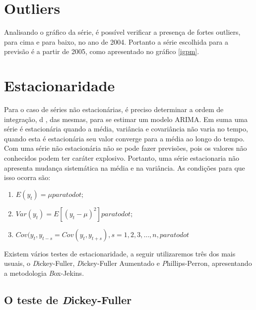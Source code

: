 \documentclass[a4paper,12pt,oneside,titlepage]{article}
\begin{document}
\section*{Outliers}

Analisando o gráfico da série, é possível verificar a presença de
fortes outliers, para cima e para baixo, no ano de 2004. Portanto a série
escolhida para a previsão é a partir de 2005, como apresentado no
gráfico \ref{igpm}.


\fontsize{10pt}{\baselineskip}

\section*{Estacionaridade}

Para o caso de séries não estacionárias, é preciso determinar a ordem de integração, d , das mesmas, para se estimar um modelo ARIMA. Em suma uma série é estacionária quando a média, variância e covariância não varia no tempo, quando esta é estacionária seu valor
converge para a média ao longo do tempo. Com uma série não
estacionária não se pode fazer previsões, pois os valores não conhecidos
podem ter caráter explosivo. Portanto, uma série estacionaria não apresenta mudança sistemática na média e na variância. As condições
para que isso ocorra são:


\begin{enumerate}[i]
	\item $ E(y_t) = \mu para todo t; $
	\item $Var(y_t) = E[(y_t-\mu)^2] para todo t; $
	\item $ Cov(y_t,y_{t-s}=Cov(y_t,y_{t+s}),s=1,2,3,...,n, para todo t $
	
\end{enumerate}


Existem vários testes de estacionaridade, a seguir utilizaremos três
dos mais usuais, o \textit Dickey-Fuller, \textit Dickey-Fuller Aumentado e \textit Phillips-Perron, apresentando a metodologia \textit Box-Jekins.   

\subsection*{O teste de \textit Dickey-Fuller}
\end{document}
